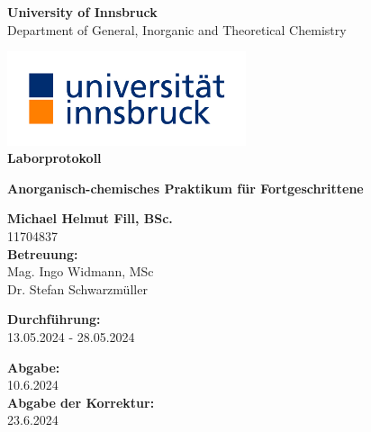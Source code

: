 \documentclass[12pt]{article}
\begin{document}
\begin{center}
\thispagestyle{empty}
\large{\textbf{University of Innsbruck}}\\[-0.9ex]
\large{Department of General, Inorganic and Theoretical Chemistry}\\
\vspace{0.3cm}
\begin{center}
\includegraphics[width=7cm]{Images/Logo.jpg}\\
\vspace{0.9cm}
\textbf{\LARGE{Laborprotokoll}}\\
\medskip\par
\vspace{1.2cm}
\Large{\textbf{Anorganisch-chemisches Praktikum für Fortgeschrittene}}\\[-0.5ex]
\vspace*{1.5cm}
\bigskip\par
\textbf{Michael Helmut Fill, BSc. }\\[-1ex]
11704837\\
\vspace*{1.5cm}
\textbf{Betreuung:} \\ Mag. Ingo Widmann, MSc \\ Dr. Stefan Schwarzmüller\\

\bigskip \par

\small{\textbf{Durchführung:} \\ 13.05.2024 - 28.05.2024\\}

\small{\textbf{Abgabe:} \\ 10.6.2024\\}
\small{\textbf{Abgabe der Korrektur:} \\ 23.6.2024\\}
\end{center}
\end{center}

\newpage

\tableofcontents

\newpage
\end{document}
